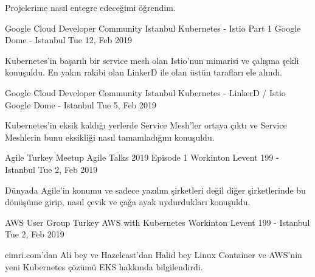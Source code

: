 \begin{cventries}
{\begin{cvitems}
        \item{Projelerime nasıl entegre edeceğimi öğrendim.}
      \end{cvitems}
    }
    \cventry
    {Google Cloud Developer Community Istanbul}
    {Kubernetes - Istio Part 1}
    {Google Dome - Istanbul}
    {Tue 12, Feb 2019}
    {
      \begin{cvitems}
        \item{Kubernetes'in başarılı bir service mesh olan Istio'nun mimarisi ve çalışma şekli konuşuldu. En yakın rakibi olan LinkerD ile olan üstün tarafları ele alındı.}
      \end{cvitems}
    }
    \cventry
    {Google Cloud Developer Community Istanbul}
    {Kubernetes - LinkerD / Istio}
    {Google Dome - Istanbul}
    {Tue 5, Feb 2019}
    {
      \begin{cvitems}
        \item{Kubernetes'in eksik kaldığı yerlerde Service Mesh'ler ortaya çıktı ve Service Meshlerin bunu eksikliği nasıl tamamladığını konuşuldu.}
      \end{cvitems}
    }
    \cventry
    {Agile Turkey Meetup}
    {Agile Talks 2019 Episode 1}
    {Workinton Levent 199 - Istanbul}
    {Tue 2, Feb 2019}
    {
      \begin{cvitems}
        \item{Dünyada Agile'in konumu ve sadece yazılım şirketleri değil diğer şirketlerinde bu dönüşüme girip, nasıl çevik ve çağa ayak uydurdukları konuşuldu.}
      \end{cvitems}
    }
    \cventry
    {AWS User Group Turkey}
    {AWS with Kubernetes}
    {Workinton Levent 199 - Istanbul}
    {Tue 2, Feb 2019}
    {
      \begin{cvitems}
        \item{cimri.com'dan Ali bey ve Hazelcast'dan Halid bey Linux Container ve AWS'nin yeni Kubernetes çözümü EKS hakkında bilgilendirdi.}
      \end{cvitems}
    }
\end{cventries}

